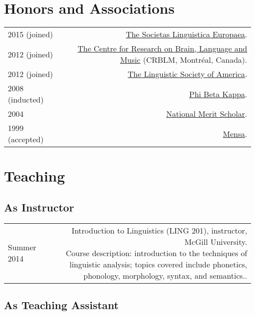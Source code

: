 \documentclass[10pt,letterpaper]{article}
\makeatletter
\newcommand{\bodywidth}{0.81}
\newcommand{\myvrule}{\color{lightgray}\vrule width 1.0pt}
\newenvironment{cvsection}{%
  \renewcommand{\arraystretch}{1.60}
  \begin{longtable}[l]{@{} L R @{}}
}{%
  \end{longtable}
}
\newcommand{\course}[2]{%
  \parbox[t]{\bodywidth\textwidth}{#1. \\ {\footnotesize Course description:
      #2.}}
}
\makeatother
\begin{document}
\section*{Honors and Associations}

\begin{cvsection}
  2015 {\footnotesize (joined)} & \href{http://www.societaslinguistica.eu/}{The
    Societas Linguistica Europaea}. \\

  2012 {\footnotesize (joined)} & \href{http://www.crblm.ca/}{The Centre for
    Research on Brain, Language and Music} (CRBLM, Montr\'{e}al, Canada). \\

  2012 {\footnotesize (joined)} &
  \href{http://www.linguisticsociety.org/}{The Linguistic Society of America}. \\

  2008 {\footnotesize (inducted)} & \href{http://www.pbk.org/}{Phi Beta Kappa}. \\

  2004 & \href{http://www.nationalmerit.org/}{National Merit Scholar}. \\

  1999 {\footnotesize (accepted)} & \href{http://www.mensa.org/}{Mensa}. \\
\end{cvsection}

\section*{Teaching}

\subsection*{As Instructor}

\begin{cvsection}
  {\small Summer} 2014 & \course{Introduction to Linguistics (LING 201),
    instructor, McGill University}{introduction to the techniques of linguistic
    analysis; topics covered include phonetics, phonology, morphology, syntax,
    and semantics.}
  \\[0.10ex]
\end{cvsection}

\vspace{-1ex}
\subsection*{As Teaching Assistant}
\end{document}
